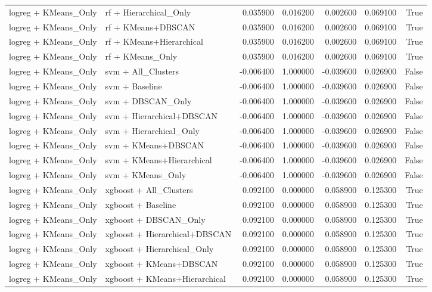 \begin{tabular}{llrrrrr}
logreg + KMeans_Only & rf + Hierarchical_Only & 0.035900 & 0.016200 & 0.002600 & 0.069100 & True \\
logreg + KMeans_Only & rf + KMeans+DBSCAN & 0.035900 & 0.016200 & 0.002600 & 0.069100 & True \\
logreg + KMeans_Only & rf + KMeans+Hierarchical & 0.035900 & 0.016200 & 0.002600 & 0.069100 & True \\
logreg + KMeans_Only & rf + KMeans_Only & 0.035900 & 0.016200 & 0.002600 & 0.069100 & True \\
logreg + KMeans_Only & svm + All_Clusters & -0.006400 & 1.000000 & -0.039600 & 0.026900 & False \\
logreg + KMeans_Only & svm + Baseline & -0.006400 & 1.000000 & -0.039600 & 0.026900 & False \\
logreg + KMeans_Only & svm + DBSCAN_Only & -0.006400 & 1.000000 & -0.039600 & 0.026900 & False \\
logreg + KMeans_Only & svm + Hierarchical+DBSCAN & -0.006400 & 1.000000 & -0.039600 & 0.026900 & False \\
logreg + KMeans_Only & svm + Hierarchical_Only & -0.006400 & 1.000000 & -0.039600 & 0.026900 & False \\
logreg + KMeans_Only & svm + KMeans+DBSCAN & -0.006400 & 1.000000 & -0.039600 & 0.026900 & False \\
logreg + KMeans_Only & svm + KMeans+Hierarchical & -0.006400 & 1.000000 & -0.039600 & 0.026900 & False \\
logreg + KMeans_Only & svm + KMeans_Only & -0.006400 & 1.000000 & -0.039600 & 0.026900 & False \\
logreg + KMeans_Only & xgboost + All_Clusters & 0.092100 & 0.000000 & 0.058900 & 0.125300 & True \\
logreg + KMeans_Only & xgboost + Baseline & 0.092100 & 0.000000 & 0.058900 & 0.125300 & True \\
logreg + KMeans_Only & xgboost + DBSCAN_Only & 0.092100 & 0.000000 & 0.058900 & 0.125300 & True \\
logreg + KMeans_Only & xgboost + Hierarchical+DBSCAN & 0.092100 & 0.000000 & 0.058900 & 0.125300 & True \\
logreg + KMeans_Only & xgboost + Hierarchical_Only & 0.092100 & 0.000000 & 0.058900 & 0.125300 & True \\
logreg + KMeans_Only & xgboost + KMeans+DBSCAN & 0.092100 & 0.000000 & 0.058900 & 0.125300 & True \\
logreg + KMeans_Only & xgboost + KMeans+Hierarchical & 0.092100 & 0.000000 & 0.058900 & 0.125300 & True \\

\end{tabular}
